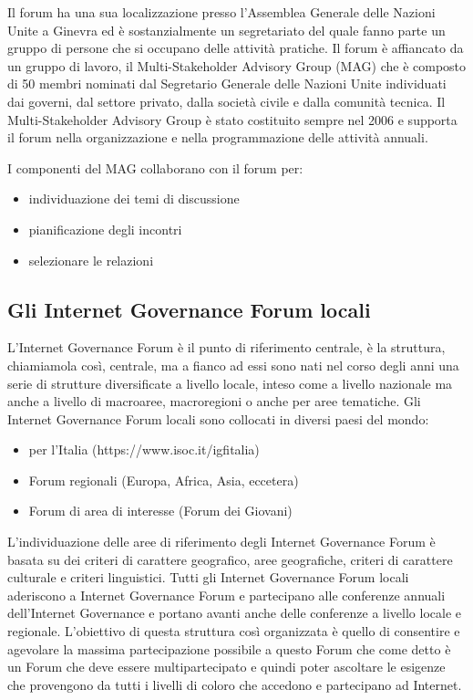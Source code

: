 Il forum ha una sua localizzazione presso l'Assemblea Generale delle Nazioni Unite a Ginevra ed è sostanzialmente un segretariato del quale fanno parte un gruppo di persone che si occupano delle attività pratiche. Il forum è affiancato da un gruppo di lavoro, il Multi-Stakeholder Advisory Group (MAG) che è composto di 50 membri nominati dal Segretario Generale delle Nazioni Unite individuati dai governi, dal settore privato, dalla società civile e dalla comunità tecnica. Il Multi-Stakeholder Advisory Group è stato costituito sempre nel 2006 e supporta il forum nella organizzazione e nella programmazione delle attività annuali.

I componenti del MAG collaborano con il forum per:
\begin{itemize}
    \item individuazione dei temi di discussione
    \item pianificazione degli incontri
    \item selezionare le relazioni
\end{itemize}

\subsection{Gli Internet Governance Forum locali}

L'Internet Governance Forum è il punto di riferimento centrale, è la struttura, chiamiamola così, centrale, ma a fianco ad essi sono nati nel corso degli anni una serie di strutture diversificate a livello locale, inteso come a livello nazionale ma anche a livello di macroaree, macroregioni o anche per aree tematiche. Gli Internet Governance Forum locali sono collocati in diversi paesi del mondo:

\begin{itemize}
    \item per l'Italia  (https://www.isoc.it/igfitalia)
    \item Forum regionali (Europa, Africa, Asia, eccetera)
    \item Forum di area di interesse (Forum dei Giovani)
\end{itemize}

L'individuazione delle aree di riferimento degli Internet Governance Forum è basata su dei criteri di carattere geografico, aree geografiche, criteri di carattere culturale e criteri linguistici. Tutti gli Internet Governance Forum locali aderiscono a Internet Governance Forum e partecipano alle conferenze annuali dell'Internet Governance e portano avanti anche delle conferenze a livello locale e regionale. L'obiettivo di questa struttura così organizzata è quello di consentire e agevolare la massima partecipazione possibile a questo Forum che come detto è un Forum che deve essere multipartecipato e quindi poter ascoltare le esigenze che provengono da tutti i livelli di coloro che accedono e partecipano ad Internet.

